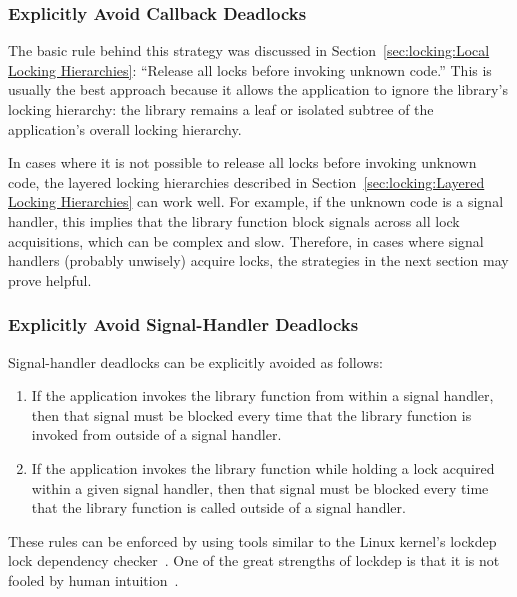 \subsubsection{Explicitly Avoid Callback Deadlocks}
\label{sec:locking:Explicitly Avoid Callback Deadlocks}

The basic rule behind this strategy was discussed in
Section~\ref{sec:locking:Local Locking Hierarchies}: ``Release all
locks before invoking unknown code.''
This is usually the best approach because it allows the application to
ignore the library's locking hierarchy: the library remains a leaf or
isolated subtree of the application's overall locking hierarchy.

In cases where it is not possible to release all locks before invoking
unknown code, the layered locking hierarchies described in
Section~\ref{sec:locking:Layered Locking Hierarchies} can work well.
For example, if the unknown code is a signal handler, this implies that
the library function block signals across all lock acquisitions, which
can be complex and slow.
Therefore, in cases where signal handlers (probably unwisely) acquire
locks, the strategies in the next section may prove helpful.

\subsubsection{Explicitly Avoid Signal-Handler Deadlocks}
\label{sec:locking:Explicitly Avoid Signal-Handler Deadlocks}

Signal-handler deadlocks can be explicitly avoided as follows:

\begin{enumerate}
\item	If the application invokes the library function from
	within a signal handler, then that signal must be blocked
	every time that the library function is invoked from outside
	of a signal handler.
\item	If the application invokes the library function
	while holding a lock acquired within a given signal
	handler, then that signal must be blocked every time that the
	library function is called outside of a signal handler.
\end{enumerate}

These rules can be enforced by using tools similar to
the Linux kernel's lockdep lock dependency
checker~\cite{JonathanCorbet2006lockdep}.
One of the great strengths of lockdep is that it is not fooled by
human intuition~\cite{StevenRostedt2011locdepCryptic}.


